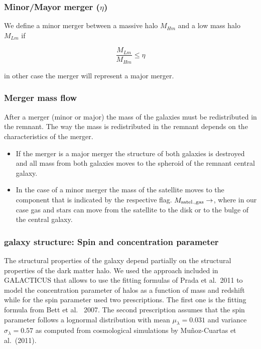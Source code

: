 \documentclass[useAMS,usenatbib]{mn2e}
\newcommand{\etal}{et al.~}
\begin{document}
\subsubsection{Minor/Mayor merger ($\eta$)}

We define a minor merger between a massive halo $M_{Hm}$ and a low
mass halo $M_{Lm}$ if

\begin{equation}
\frac{M_{Lm}}{M_{Hm}} \leq \eta
\end{equation}

in other case the merger will represent a major merger.

\subsubsection{Merger mass flow}

After a merger (minor or major) the mass of the galaxies must be
redistributed in the remnant. The way the mass is redistributed in the
remnant depends on the characteristics of the merger.

\begin{itemize}

\item
If the merger is a major merger the structure of both galaxies is
destroyed and all mass from both galaxies moves to the spheroid of the
remnant central galaxy.

\item
In the case of a minor merger the mass of the satellite moves to the
component that is indicated by the respective flag. $M_{{\rm
    satel.,gas}}\to$, where in our case gas and stars can move from
the satellite to the disk or to the bulge of the central galaxy.

\end{itemize}


\subsubsection{galaxy structure: Spin and concentration parameter}

The structural properties of the galaxy depend partially on the
structural properties of the dark matter halo. We used the approach
included in GALACTICUS that allows to use the fitting formulas of
Prada \etal 2011 to model the concentration parameter of halos as a
function of mass and redshift while for the spin parameter used two
prescriptions. The first one is the fitting formula from Bett \etal
2007. The second prescription assumes that the spin parameter follows
a lognormal distribution with mean $\mu_{\lambda} = 0.031$ and
variance $\sigma_{\lambda} = 0.57$ as computed from cosmological
simulations by Mu\~noz-Cuartas \etal (2011).
\end{document}
